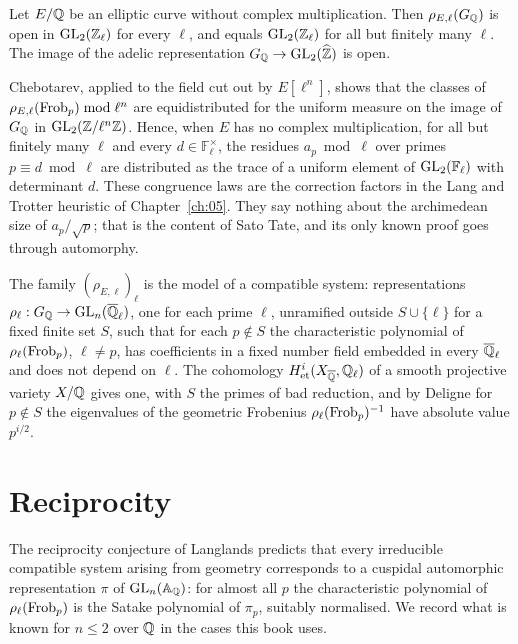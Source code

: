 \begin{theorem}\label{thm:ch3serre}
Let $E/\mathbb{Q}$ be an elliptic curve without complex multiplication. Then $\rho_{E,\ell}(G_{\mathbb{Q}})$ is open in $\mathrm{GL}_2(\mathbb{Z}_\ell)$ for every $\ell$, and equals $\mathrm{GL}_2(\mathbb{Z}_\ell)$ for all but finitely many $\ell$. The image of the adelic representation $G_{\mathbb{Q}}\to\mathrm{GL}_2(\widehat{\mathbb{Z}})$ is open.
\end{theorem}

Chebotarev, applied to the field cut out by $E[\ell^n]$, shows that the classes of $\rho_{E,\ell}(\operatorname{Frob}_p)\bmod\ell^n$ are equidistributed for the uniform measure on the image of $G_{\mathbb{Q}}$ in $\mathrm{GL}_2(\mathbb{Z}/\ell^n\mathbb{Z})$. Hence, when $E$ has no complex multiplication, for all but finitely many $\ell$ and every $d\in\mathbb{F}_\ell^\times$, the residues $a_p\bmod\ell$ over primes $p\equiv d\bmod\ell$ are distributed as the trace of a uniform element of $\mathrm{GL}_2(\mathbb{F}_\ell)$ with determinant $d$. These congruence laws are the correction factors in the Lang and Trotter heuristic of Chapter~\ref{ch:05}. They say nothing about the archimedean size of $a_p/\sqrt p$; that is the content of Sato Tate, and its only known proof goes through automorphy.

The family $(\rho_{E,\ell})_\ell$ is the model of a compatible system: representations $\rho_\ell:G_{\mathbb{Q}}\to\mathrm{GL}_n(\overline{\mathbb{Q}}_\ell)$, one for each prime $\ell$, unramified outside $S\cup\{\ell\}$ for a fixed finite set $S$, such that for each $p\notin S$ the characteristic polynomial of $\rho_\ell(\operatorname{Frob}_p)$, $\ell\ne p$, has coefficients in a fixed number field embedded in every $\overline{\mathbb{Q}}_\ell$ and does not depend on $\ell$. The cohomology $H^i_{\mathrm{et}}(X_{\overline{\mathbb{Q}}},\mathbb{Q}_\ell)$ of a smooth projective variety $X/\mathbb{Q}$ gives one, with $S$ the primes of bad reduction, and by Deligne \cite{deligne1974} for $p\notin S$ the eigenvalues of the geometric Frobenius $\rho_\ell(\operatorname{Frob}_p)^{-1}$ have absolute value $p^{i/2}$.

\section{Reciprocity}\label{sec:ch3recip}

The reciprocity conjecture of Langlands \cite{langlands1970} predicts that every irreducible compatible system arising from geometry corresponds to a cuspidal automorphic representation $\pi$ of $\mathrm{GL}_n(\mathbb{A}_{\mathbb{Q}})$: for almost all $p$ the characteristic polynomial of $\rho_\ell(\operatorname{Frob}_p)$ is the Satake polynomial of $\pi_p$, suitably normalised. We record what is known for $n\le2$ over $\mathbb{Q}$ in the cases this book uses.

